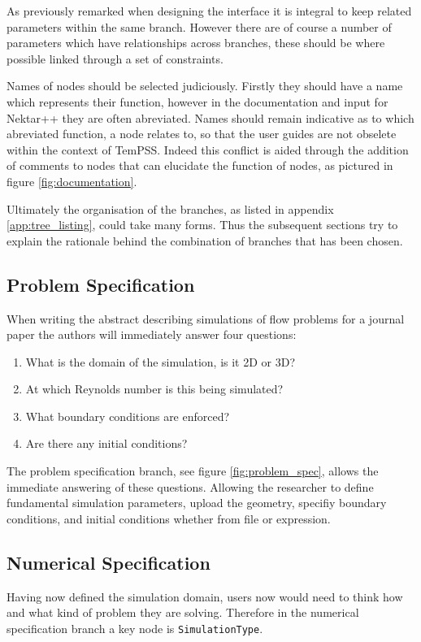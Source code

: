 \documentclass[11pt, a4paper]{report}
\begin{document}
As previously remarked when designing the interface it is integral to keep related parameters within the same branch. However there are of course a number of parameters which have relationships across branches, these should be where possible linked through a set of constraints.

Names of nodes should be selected judiciously. Firstly they should have a name which represents their function, however in the documentation and input for Nektar++ they are often abreviated. Names should remain indicative as to which abreviated function, a node relates to, so that the user guides are not obselete within the context of TemPSS. Indeed this conflict is aided through the addition of comments to nodes that can elucidate the function of nodes, as pictured in figure \ref{fig:documentation}.

Ultimately the organisation of the branches, as listed in appendix \ref{app:tree_listing}, could take many forms. Thus the subsequent sections try to explain the rationale behind the combination of branches that has been chosen.

\subsection{Problem Specification}
When writing the abstract describing simulations of flow problems for a journal paper the authors will immediately answer four questions:
\begin{enumerate}
\item What is the domain of the simulation, is it 2D or 3D?
\item At which Reynolds number is this being simulated?
\item What boundary conditions are enforced?
\item Are there any initial conditions?
\end{enumerate}

The problem specification branch, see figure \ref{fig:problem_spec}, allows the immediate answering of these questions. Allowing the researcher to define fundamental simulation parameters, upload the geometry, specifiy boundary conditions, and initial conditions whether from file or expression.	

\newpage
\subsection{Numerical Specification}
Having now defined the simulation domain, users now would need to think how and what kind of problem they are solving. Therefore in the numerical specification branch a key node is \texttt{SimulationType}.
\end{document}
